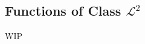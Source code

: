 \documentclass[../poma-notes.tex]{subfiles}
\begin{document}
\subsection*{Functions of Class $\mathscr{L}^2$}

WIP
\end{document}
